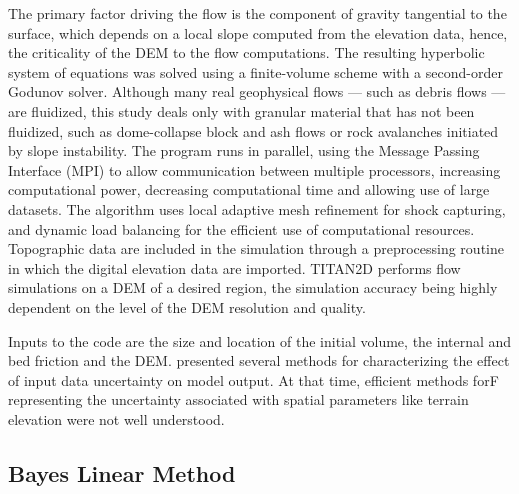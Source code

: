 \documentclass[12pt]{article}
\begin{document}
The primary factor driving the flow is the component of gravity
tangential to the surface, which depends on a local slope computed
from the elevation data, hence, the criticality of the DEM to the flow
computations. The resulting hyperbolic system of equations was solved
using a finite-volume scheme with a second-order Godunov
solver. Although many real geophysical flows --- such as debris flows
--- are fluidized, this study deals only with granular material
that has not been fluidized, such as dome-collapse block and ash flows
or rock avalanches initiated by slope instability.  The program runs
in parallel, using the Message Passing Interface (MPI) to allow
communication between multiple processors, increasing computational
power, decreasing computational time and allowing use of large
datasets. The algorithm uses local adaptive mesh refinement for shock
capturing, and dynamic load balancing for the efficient use of
computational resources. Topographic data are included in the
simulation through a preprocessing routine in which the digital
elevation data are imported.  TITAN2D performs flow simulations on a
DEM of a desired region, the simulation accuracy being highly
dependent on the level of the DEM resolution and quality.

Inputs to the code are the size and location of the initial volume,
the internal and bed friction and the DEM. \citet{Keith} presented
several methods for characterizing the effect of input data
uncertainty on model output. At that time, efficient methods forF
representing the uncertainty associated with spatial parameters like
terrain elevation were not well understood.

\subsection{Bayes Linear Method}
\end{document}
